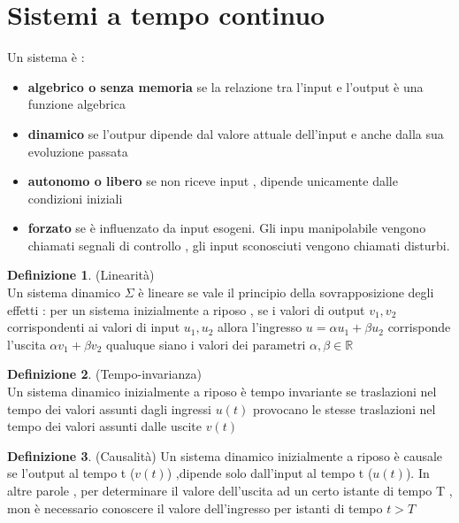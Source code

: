 \documentclass{article}
\theoremstyle{definition}
\newtheorem*{definizione}{Definizione}
\newcommand{\R}{\mathbb{R}}
\begin{document}
\section{Sistemi a tempo continuo}
\begin{center}
\end{center}
Un sistema è :
\begin{itemize}
	\item \textbf{algebrico o senza memoria} se la relazione tra l'input e l'output è una funzione algebrica
	\item \textbf{dinamico} se l'outpur dipende dal valore attuale dell'input e anche dalla sua evoluzione passata 
	\item \textbf{autonomo o libero} se non riceve input , dipende unicamente dalle condizioni iniziali 
	\item \textbf{forzato} se è influenzato da input esogeni. Gli inpu manipolabile vengono chiamati segnali di controllo , gli input sconosciuti vengono chiamati disturbi.
\end{itemize}
\begin{definizione} (Linearità)
	\\ Un sistema dinamico $\Sigma$ è lineare se vale il principio della sovrapposizione degli effetti : per un sistema inizialmente a riposo , se i valori di output $v_1 , v_2$ corrispondenti ai valori di input $u_1,u_2$ allora l'ingresso $u=\alpha u_1 + \beta u_2$ corrisponde l'uscita $\alpha v_1 + \beta v_2$ qualuque siano i valori dei parametri $\alpha , \beta \in \R$
\end{definizione}
\begin{definizione}(Tempo-invarianza)\\
	Un sistema dinamico inizialmente a riposo è tempo invariante se traslazioni nel tempo dei valori assunti dagli ingressi $u(t)$ provocano le stesse traslazioni nel tempo dei valori assunti dalle uscite $v(t)$
\end{definizione}
\begin{definizione}(Causalità)
	Un sistema dinamico inizialmente a riposo è causale se l'output al tempo t ($v(t)$) ,dipende solo dall'input al tempo t ($u(t)$). In altre parole , per determinare il valore dell'uscita ad un certo istante di tempo T , mon è necessario conoscere il valore dell'ingresso per istanti di tempo $t > T$
\end{definizione}
\end{document}
